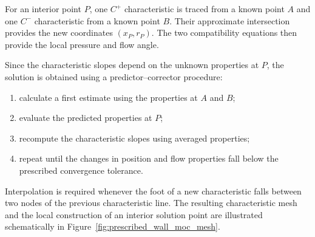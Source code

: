For an interior point $P$, one $C^+$ characteristic is traced from a
known point $A$ and one $C^-$ characteristic from a known point $B$.
Their approximate intersection provides the new coordinates
$(x_P,r_P)$. The two compatibility equations then provide the local
pressure and flow angle.

Since the characteristic slopes depend on the unknown properties at
$P$, the solution is obtained using a predictor--corrector procedure:

\begin{enumerate}
    \item calculate a first estimate using the properties at $A$ and
    $B$;

    \item evaluate the predicted properties at $P$;

    \item recompute the characteristic slopes using averaged properties;

    \item repeat until the changes in position and flow properties fall
    below the prescribed convergence tolerance.
\end{enumerate}

Interpolation is required whenever the foot of a new characteristic
falls between two nodes of the previous characteristic line. The resulting characteristic mesh and the local construction of an
interior solution point are illustrated schematically in
Figure~\ref{fig:prescribed_wall_moc_mesh}.

